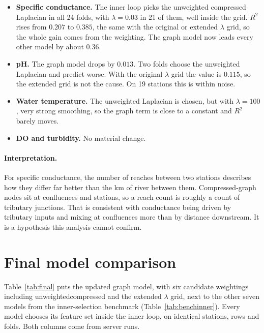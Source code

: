 \documentclass[11pt]{article}
\newcommand{\codeus}{\textunderscore\allowbreak}
\newcommand{\code}[1]{{\ttfamily\let\_\codeus #1}}
\begin{document}
\begin{itemize}
  \item \textbf{Specific conductance.} The inner loop picks the unweighted compressed Laplacian in all
        24 folds, with $\lambda=0.03$ in 21 of them, well inside the grid. $R^2$ rises from $0.207$ to
        $0.385$, the same with the original or extended $\lambda$ grid, so the whole gain comes from
        the weighting. The graph model now leads every other model by about $0.36$.
  \item \textbf{pH.} The graph model drops by $0.013$. Two folds choose the unweighted Laplacian and
        predict worse. With the original $\lambda$ grid the value is $0.115$, so the extended grid is
        not the cause. On 19 stations this is within noise.
  \item \textbf{Water temperature.} The unweighted Laplacian is chosen, but with $\lambda=100$, very
        strong smoothing, so the graph term is close to a constant and $R^2$ barely moves.
  \item \textbf{DO and turbidity.} No material change.
\end{itemize}

\paragraph{Interpretation.} For specific conductance, the number of reaches between two stations
describes how they differ far better than the km of river between them. Compressed-graph nodes sit at
confluences and stations, so a reach count is roughly a count of tributary junctions. That is
consistent with conductance being driven by tributary inputs and mixing at confluences more than by
distance downstream. It is a hypothesis this analysis cannot confirm.

\section{Final model comparison}
\label{sec:final}

Table~\ref{tab:final} puts the updated graph model, with six candidate weightings including
\code{unweighted\_compressed} and the extended $\lambda$ grid, next to the other seven models from
the inner-selection benchmark (Table~\ref{tab:benchinner}). Every model chooses its feature set inside
the inner loop, on identical stations, rows and folds. Both columns come from server runs.
\end{document}
